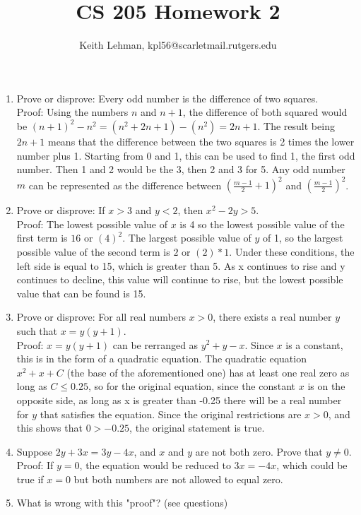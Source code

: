 \documentclass{article}
\title{CS 205 Homework 2}
\author{Keith Lehman, kpl56@scarletmail.rutgers.edu}
\begin{document}
\maketitle

\begin{enumerate}
\item Prove or disprove: Every odd number is the difference of two squares. \\
    Proof: Using the numbers $n$ and $n+1$, the difference of both squared would be $(n+1)^2 - n^2 = (n^2+2n+1) - (n^2) = 2n + 1$. The result being $2n+1$ means that the difference between the two squares is 2 times the lower number plus 1. Starting from 0 and 1, this can be used to find 1, the first odd number. Then 1 and 2 would be the 3, then 2 and 3 for 5. Any odd number $m$ can be represented as the difference between $(\frac{m-1}{2} +1)^2$ and $(\frac{m-1}{2})^2$.
\item Prove or disprove: If $x > 3$ and $y < 2$, then $x^2 - 2y > 5$. \\
    Proof: The lowest possible value of $x$ is 4 so the lowest possible value of the first term is $16$ or $(4)^2$. The largest possible value of $y$ of 1, so the largest possible value of the second term is $2$ or $(2)*1$. Under these conditions, the left side is equal to 15, which is greater than 5. As x continues to rise and y continues to decline, this value will continue to rise, but the lowest possible value that can be found is 15.
\item Prove or disprove: For all real numbers $x>0$, there exists a real number $y$ such that $x=y(y+1)$. \\
    Proof: $x=y(y+1)$ can be rerranged as $y^2+y-x$. Since $x$ is a constant, this is in the form of a quadratic equation. The quadratic equation $x^2+x+C$ (the base of the aforementioned one) has at least one real zero as long as $C \leq 0.25$, so for the original equation, since the constant $x$ is on the opposite side, as long as x is greater than -0.25 there will be a real number for $y$ that satisfies the equation. Since the original restrictions are $x > 0$, and this shows that $0 > -0.25$, the original statement is true.  
\item Suppose $2y+3x=3y-4x$, and $x$ and $y$ are not both zero. Prove that $y \neq 0$. \\
    Proof: If $y=0$, the equation would be reduced to $3x=-4x$, which could be true if $x=0$ but both numbers are not allowed to equal zero. \Lightning
\item What is wrong with this "proof"? (see questions) \\

\end{enumerate}
\end{document}
